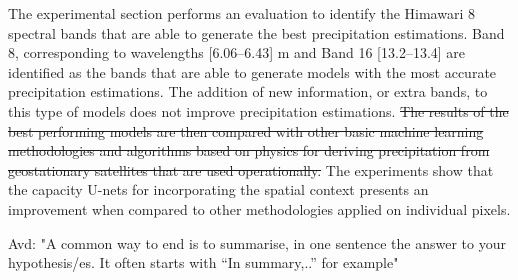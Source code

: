 \documentclass[3p,times]{elsarticle}
\begin{document}
The experimental section performs an evaluation to identify the Himawari 8 spectral bands that are able to generate the best precipitation estimations. Band 8, corresponding to wavelengths [6.06–6.43] \textmu m and Band 16 [13.2–13.4] \textmu are identified as the bands that are able to generate models with the most accurate precipitation estimations. The addition of new information, or extra bands, to this type of models does not improve precipitation estimations. \st{The results of the best performing models are then compared with other basic machine learning methodologies and algorithms based on physics for deriving precipitation from geostationary satellites that are used operationally.} The experiments show that the capacity U-nets for incorporating the spatial context presents an improvement when compared to other methodologies applied on individual pixels.

Avd: "A common way to end is to summarise, in one sentence the answer to your hypothesis/es. It often starts with “In summary,..” for example"













\end{document}
